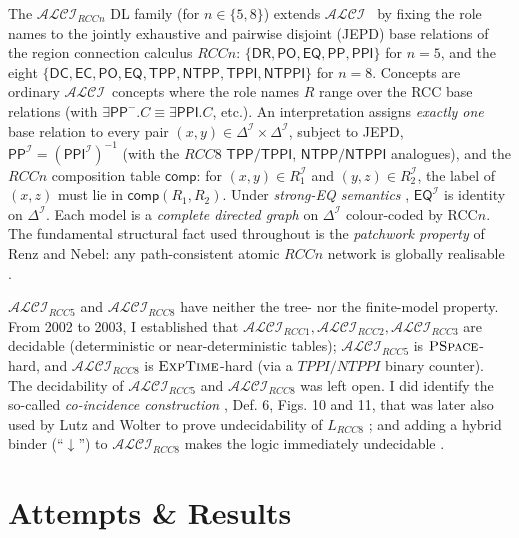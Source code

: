 \documentclass[
]{ceurart}
\theoremstyle{definition}
\newcommand{\ALCI}{\ensuremath{\mathcal{ALCI}}}
\newcommand{\ALCIRCC}[1]{\ensuremath{\mathcal{ALCI}_{\mathit{RCC#1}}}}
\newcommand{\LRCC}[1]{\ensuremath{L_{\mathit{RCC#1}}}}
\newcommand{\DR}{\ensuremath{\mathsf{DR}}}
\newcommand{\PO}{\ensuremath{\mathsf{PO}}}
\newcommand{\EQ}{\ensuremath{\mathsf{EQ}}}
\newcommand{\PP}{\ensuremath{\mathsf{PP}}}
\newcommand{\PPI}{\ensuremath{\mathsf{PPI}}}
\newcommand{\TPP}{\ensuremath{\mathsf{TPP}}}
\newcommand{\NTPP}{\ensuremath{\mathsf{NTPP}}}
\newcommand{\TPPI}{\ensuremath{\mathsf{TPPI}}}
\newcommand{\NTPPI}{\ensuremath{\mathsf{NTPPI}}}
\newcommand{\DC}{\ensuremath{\mathsf{DC}}}
\newcommand{\EC}{\ensuremath{\mathsf{EC}}}
\newcommand{\comp}{\ensuremath{\mathsf{comp}}}
\newcommand{\EXPTIME}{\textsc{ExpTime}}
\newcommand{\PSPACE}{\textsc{PSpace}}
\begin{document}
The \ALCIRCC{n} DL family \cite{Wessel2002, Wessel2003} (for $n \in
\{5,8\}$) extends \ALCI\ \cite{DLHandbook2007} by fixing the role
names to the jointly exhaustive and pairwise disjoint (JEPD) base
relations of the region connection calculus $\mathit{RCC}n$:
$\{\DR,\PO,\EQ,\PP,\PPI\}$ for $n=5$, and the eight
$\{\DC,\EC,\PO,\EQ,\TPP,\NTPP,\TPPI,\NTPPI\}$ for $n=8$.  Concepts are
ordinary \ALCI\ concepts where the role names $R$ range over the RCC
base relations (with $\exists \PP^{-}.C \equiv \exists \PPI.C$, etc.).
An interpretation assigns \emph{exactly one} base relation to every
pair $(x,y) \in \Delta^{\mathcal{I}} \times \Delta^{\mathcal{I}}$,
subject to JEPD, $\PP^{\mathcal{I}} = (\PPI^{\mathcal{I}})^{-1}$ (with
the $\mathit{RCC}8$ $\TPP/\TPPI$, $\NTPP/\NTPPI$ analogues), and the
$\mathit{RCC}n$ composition table $\comp$: for $(x,y) \in
R_1^{\mathcal{I}}$ and $(y,z) \in R_2^{\mathcal{I}}$, the label of
$(x,z)$ must lie in $\comp(R_1, R_2)$.  Under \emph{strong-EQ
semantics} \cite{Wessel2003}, $\EQ^{\mathcal{I}}$ is identity on
$\Delta^{\mathcal{I}}$. Each model is a \emph{complete directed graph}
on $\Delta^{\mathcal{I}}$ colour-coded by RCC$n$. The fundamental
structural fact used throughout is the \emph{patchwork property} of
Renz and Nebel: any path-consistent atomic $\mathit{RCC}n$ network is
globally realisable \cite{RenzNebel1999}.

$\ALCIRCC{5}$ and $\ALCIRCC{8}$ have neither the tree- nor the
finite-model property. From 2002 to 2003, I established that
$\ALCIRCC{1}, \ALCIRCC{2}, \ALCIRCC{3}$ are decidable
\cite{Wessel2002, Wessel2003} (deterministic or near-deterministic
tables); $\ALCIRCC{5}$ is $\PSPACE$-hard, and $\ALCIRCC{8}$ is
$\EXPTIME$-hard (via a $\mathit{TPPI}/\mathit{NTPPI}$ binary counter).
The decidability of $\ALCIRCC{5}$ and $\ALCIRCC{8}$ was left
open. I did identify the so-called \emph{co-incidence construction}
\cite{Wessel2003}, Def. 6, Figs. 10 and 11, that was later also used
by Lutz and Wolter to prove undecidability of $\LRCC{8}$
\cite{LutzWolter2006}; and adding a hybrid binder
(``$\downarrow$'') to $\ALCIRCC{8}$ makes the logic immediately
undecidable \cite{Wessel2003}.

\section{Attempts \& Results}
\label{sec:ea-results}
\end{document}
